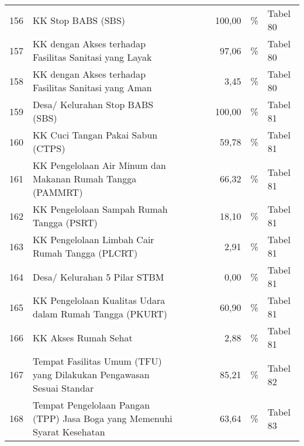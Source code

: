 \begin{small}
\begin{longtable}{rY{12em}rrrrY{5em}Y{5em}}
	156 & KK Stop BABS (SBS)                                                          &        &        &                    &   100,00 & \%                             & Tabel 80 \\
	157 & KK dengan Akses terhadap Fasilitas Sanitasi yang Layak                      &        &        &                    &    97,06 & \%                             & Tabel 80 \\
	158 & KK dengan Akses terhadap Fasilitas Sanitasi yang Aman                       &        &        &                    &     3,45 & \%                             & Tabel 80 \\
	159 & Desa/ Kelurahan Stop BABS (SBS)                                             &        &        &                    &   100,00 & \%                             & Tabel 81 \\
	160 & KK Cuci Tangan Pakai Sabun (CTPS)                                           &        &        &                    &    59,78 & \%                             & Tabel 81 \\
	161 & KK Pengelolaan Air Minum dan Makanan Rumah Tangga (PAMMRT)                  &        &        &                    &    66,32 & \%                             & Tabel 81 \\
	162 & KK Pengelolaan Sampah Rumah Tangga (PSRT)                                   &        &        &                    &    18,10 & \%                             & Tabel 81 \\
	163 & KK Pengelolaan Limbah Cair Rumah Tangga (PLCRT)                             &        &        &                    &     2,91 & \%                             & Tabel 81 \\
	164 & Desa/ Kelurahan 5 Pilar STBM                                                &        &        &                    &     0,00 & \%                             & Tabel 81 \\
	165 & KK Pengelolaan Kualitas Udara dalam Rumah Tangga (PKURT)                    &        &        &                    &    60,90 & \%                             & Tabel 81 \\
	166 & KK Akses Rumah Sehat                                                        &        &        &                    &     2,88 & \%                             & Tabel 81 \\
	167 & Tempat Fasilitas Umum (TFU) yang Dilakukan Pengawasan Sesuai Standar        &        &        &                    &    85,21 & \%                             & Tabel 82 \\
	168 & Tempat Pengelolaan Pangan (TPP) Jasa Boga yang Memenuhi Syarat Kesehatan    &        &        &                    &    63,64 & \%                             & Tabel 83 \\ 
	 \bottomrule
\end{longtable}%
\end{small}